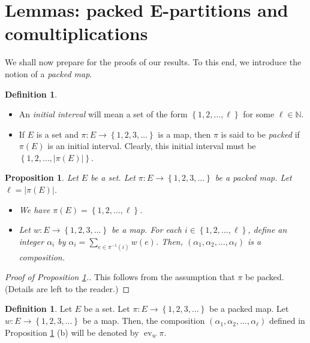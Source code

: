 \documentclass[12pt]{article}
\theoremstyle{plain}
\newtheorem{proposition}[theorem]{Proposition}
\theoremstyle{definition}
\newtheorem{definition}[theorem]{Definition}
\theoremstyle{remark}
\let\sumnonlimits\sum
\renewcommand{\sum}{\sumnonlimits\limits}
\newcommand{\ev}{\operatorname{ev}}
\newcommand{\EE}{{\mathbf{E}}}
\newcommand{\NN}{{\mathbb{N}}}
\begin{document}
\section{Lemmas: packed $\EE$-partitions and comultiplications}
\label{sect.lemmas}

We shall now prepare for the proofs of our results. To this end,
we introduce the notion of a \textit{packed map}.

\begin{definition}
\begin{itemize}

\item[(a)]
An \textit{initial interval} will mean a set of the form
$\left\{1, 2, \ldots, \ell\right\}$ for some $\ell \in \NN$.

\item[(b)]
If $E$ is a set and $\pi : E \to \left\{1, 2, 3, \ldots\right\}$ is
a map, then $\pi$ is said to be \textit{packed} if $\pi\left(E\right)$
is an initial interval. Clearly, this initial interval must be
$\left\{1, 2, \ldots, \left|\pi\left(E\right)\right|\right\}$.

\end{itemize}
\end{definition}

\begin{proposition}
\label{prop.ev.comp}
Let $E$ be a set.
Let $\pi : E \to \left\{1, 2, 3, \ldots\right\}$ be a packed map.
Let $\ell = \left|\pi\left(E\right)\right|$.

\begin{itemize}
\item[(a)] We have $\pi\left(E\right) = \left\{1, 2, \ldots, \ell\right\}$.

\item[(b)] Let $w : E \to \left\{1, 2, 3, \ldots\right\}$ be a
map. For each $i \in \left\{1, 2, \ldots, \ell\right\}$, define an
integer $\alpha_i$ by $\alpha_i = \sum_{e \in \pi^{-1}\left(i\right)}
w\left(e\right)$. Then,
$\left(\alpha_1, \alpha_2, \ldots, \alpha_\ell\right)$ is a
composition.
\end{itemize}
\end{proposition}

\begin{proof}[Proof of Proposition \ref{prop.ev.comp}.]
This follows from the assumption that $\pi$ be packed. (Details
are left to the reader.)
\end{proof}

\begin{definition}
Let $E$ be a set.
Let $\pi : E \to \left\{1, 2, 3, \ldots\right\}$ be a packed map.
Let $w : E \to \left\{1, 2, 3, \ldots\right\}$ be a map. Then, the
composition $\left(\alpha_1, \alpha_2, \ldots, \alpha_\ell\right)$
defined in Proposition \ref{prop.ev.comp} (b) will be denoted by
$\ev_w \pi$.
\end{definition}
\end{document}
